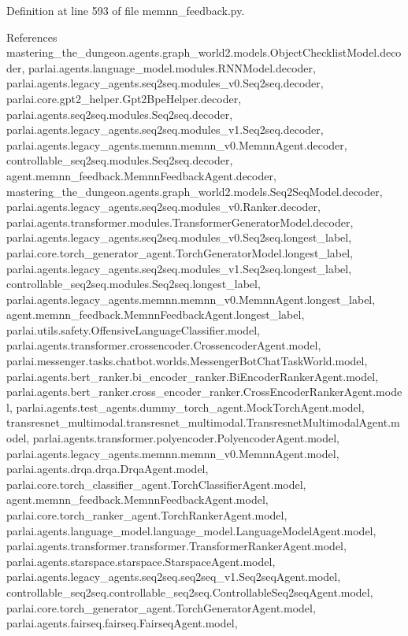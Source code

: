 Definition at line 593 of file memnn\+\_\+feedback.\+py.



References mastering\+\_\+the\+\_\+dungeon.\+agents.\+graph\+\_\+world2.\+models.\+Object\+Checklist\+Model.\+decoder, parlai.\+agents.\+language\+\_\+model.\+modules.\+R\+N\+N\+Model.\+decoder, parlai.\+agents.\+legacy\+\_\+agents.\+seq2seq.\+modules\+\_\+v0.\+Seq2seq.\+decoder, parlai.\+core.\+gpt2\+\_\+helper.\+Gpt2\+Bpe\+Helper.\+decoder, parlai.\+agents.\+seq2seq.\+modules.\+Seq2seq.\+decoder, parlai.\+agents.\+legacy\+\_\+agents.\+seq2seq.\+modules\+\_\+v1.\+Seq2seq.\+decoder, parlai.\+agents.\+legacy\+\_\+agents.\+memnn.\+memnn\+\_\+v0.\+Memnn\+Agent.\+decoder, controllable\+\_\+seq2seq.\+modules.\+Seq2seq.\+decoder, agent.\+memnn\+\_\+feedback.\+Memnn\+Feedback\+Agent.\+decoder, mastering\+\_\+the\+\_\+dungeon.\+agents.\+graph\+\_\+world2.\+models.\+Seq2\+Seq\+Model.\+decoder, parlai.\+agents.\+legacy\+\_\+agents.\+seq2seq.\+modules\+\_\+v0.\+Ranker.\+decoder, parlai.\+agents.\+transformer.\+modules.\+Transformer\+Generator\+Model.\+decoder, parlai.\+agents.\+legacy\+\_\+agents.\+seq2seq.\+modules\+\_\+v0.\+Seq2seq.\+longest\+\_\+label, parlai.\+core.\+torch\+\_\+generator\+\_\+agent.\+Torch\+Generator\+Model.\+longest\+\_\+label, parlai.\+agents.\+legacy\+\_\+agents.\+seq2seq.\+modules\+\_\+v1.\+Seq2seq.\+longest\+\_\+label, controllable\+\_\+seq2seq.\+modules.\+Seq2seq.\+longest\+\_\+label, parlai.\+agents.\+legacy\+\_\+agents.\+memnn.\+memnn\+\_\+v0.\+Memnn\+Agent.\+longest\+\_\+label, agent.\+memnn\+\_\+feedback.\+Memnn\+Feedback\+Agent.\+longest\+\_\+label, parlai.\+utils.\+safety.\+Offensive\+Language\+Classifier.\+model, parlai.\+agents.\+transformer.\+crossencoder.\+Crossencoder\+Agent.\+model, parlai.\+messenger.\+tasks.\+chatbot.\+worlds.\+Messenger\+Bot\+Chat\+Task\+World.\+model, parlai.\+agents.\+bert\+\_\+ranker.\+bi\+\_\+encoder\+\_\+ranker.\+Bi\+Encoder\+Ranker\+Agent.\+model, parlai.\+agents.\+bert\+\_\+ranker.\+cross\+\_\+encoder\+\_\+ranker.\+Cross\+Encoder\+Ranker\+Agent.\+model, parlai.\+agents.\+test\+\_\+agents.\+dummy\+\_\+torch\+\_\+agent.\+Mock\+Torch\+Agent.\+model, transresnet\+\_\+multimodal.\+transresnet\+\_\+multimodal.\+Transresnet\+Multimodal\+Agent.\+model, parlai.\+agents.\+transformer.\+polyencoder.\+Polyencoder\+Agent.\+model, parlai.\+agents.\+legacy\+\_\+agents.\+memnn.\+memnn\+\_\+v0.\+Memnn\+Agent.\+model, parlai.\+agents.\+drqa.\+drqa.\+Drqa\+Agent.\+model, parlai.\+core.\+torch\+\_\+classifier\+\_\+agent.\+Torch\+Classifier\+Agent.\+model, agent.\+memnn\+\_\+feedback.\+Memnn\+Feedback\+Agent.\+model, parlai.\+core.\+torch\+\_\+ranker\+\_\+agent.\+Torch\+Ranker\+Agent.\+model, parlai.\+agents.\+language\+\_\+model.\+language\+\_\+model.\+Language\+Model\+Agent.\+model, parlai.\+agents.\+transformer.\+transformer.\+Transformer\+Ranker\+Agent.\+model, parlai.\+agents.\+starspace.\+starspace.\+Starspace\+Agent.\+model, parlai.\+agents.\+legacy\+\_\+agents.\+seq2seq.\+seq2seq\+\_\+v1.\+Seq2seq\+Agent.\+model, controllable\+\_\+seq2seq.\+controllable\+\_\+seq2seq.\+Controllable\+Seq2seq\+Agent.\+model, parlai.\+core.\+torch\+\_\+generator\+\_\+agent.\+Torch\+Generator\+Agent.\+model, parlai.\+agents.\+fairseq.\+fairseq.\+Fairseq\+Agent.\+model, 